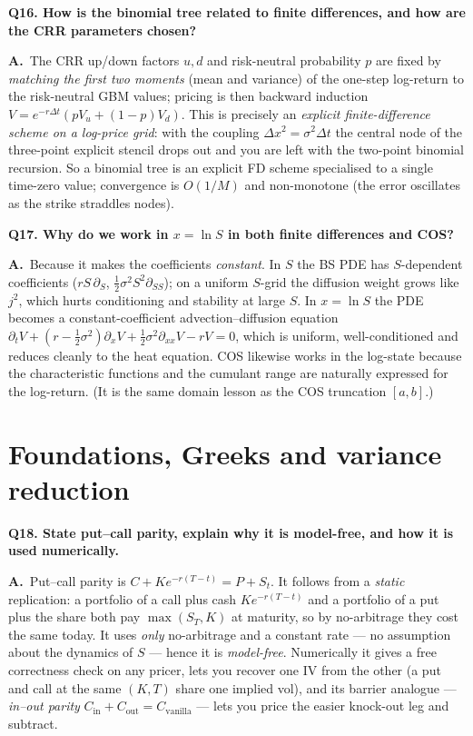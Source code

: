 \documentclass[11pt]{article}
\newcommand{\Qq}[1]{\bigskip\noindent\textbf{\large #1}\par\nobreak\smallskip}
\newcommand{\A}{\noindent\textbf{A.}\ }
\begin{document}
\Qq{Q16. How is the binomial tree related to finite differences, and how are the CRR parameters chosen?}
\A The CRR up/down factors $u,d$ and risk-neutral probability $p$ are fixed by \emph{matching the first two
moments} (mean and variance) of the one-step log-return to the risk-neutral GBM values; pricing is then backward
induction $V=e^{-r\Delta t}(pV_u+(1-p)V_d)$. This is precisely an \emph{explicit finite-difference scheme on a
log-price grid}: with the coupling $\Delta x^2=\sigma^2\Delta t$ the central node of the three-point explicit
stencil drops out and you are left with the two-point binomial recursion. So a binomial tree is an explicit FD
scheme specialised to a single time-zero value; convergence is $O(1/M)$ and non-monotone (the error oscillates
as the strike straddles nodes).

\Qq{Q17. Why do we work in $x=\ln S$ in both finite differences and COS?}
\A Because it makes the coefficients \emph{constant}. In $S$ the BS PDE has $S$-dependent coefficients
($rS\,\partial_S$, $\tfrac12\sigma^2S^2\partial_{SS}$); on a uniform $S$-grid the diffusion weight grows like
$j^2$, which hurts conditioning and stability at large $S$. In $x=\ln S$ the PDE becomes a constant-coefficient
advection--diffusion equation $\partial_t V+(r-\tfrac12\sigma^2)\partial_x V+\tfrac12\sigma^2\partial_{xx}V-rV=0$,
which is uniform, well-conditioned and reduces cleanly to the heat equation. COS likewise works in the log-state
because the characteristic functions and the cumulant range are naturally expressed for the log-return. (It is
the same domain lesson as the COS truncation $[a,b]$.)

\section{Foundations, Greeks and variance reduction}

\Qq{Q18. State put--call parity, explain why it is model-free, and how it is used numerically.}
\A Put--call parity is $C+Ke^{-r(T-t)}=P+S_t$. It follows from a \emph{static} replication: a portfolio of a
call plus cash $Ke^{-r(T-t)}$ and a portfolio of a put plus the share both pay $\max(S_T,K)$ at maturity, so by
no-arbitrage they cost the same today. It uses \emph{only} no-arbitrage and a constant rate --- no assumption
about the dynamics of $S$ --- hence it is \emph{model-free}. Numerically it gives a free correctness check on
any pricer, lets you recover one IV from the other (a put and call at the same $(K,T)$ share one implied vol),
and its barrier analogue --- \emph{in--out parity} $C_{\text{in}}+C_{\text{out}}=C_{\text{vanilla}}$ --- lets
you price the easier knock-out leg and subtract.
\end{document}
